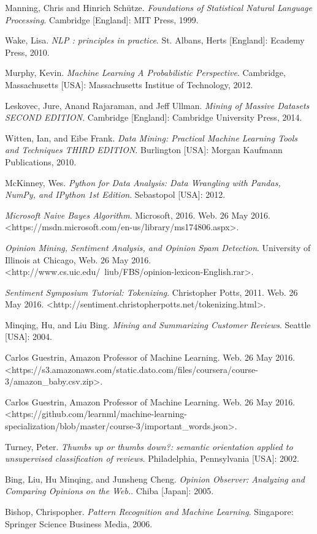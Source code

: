 \documentclass[12pt]{report}
\begin{document}
\begin{thebibliography}{9}

 Manning, Chris and Hinrich Sch{\"u}tze. \textit{Foundations of Statistical Natural Language Processing}. Cambridge [England]: MIT Press, 1999.

 Wake, Lisa. \textit{NLP : principles in practice}. St. Albans, Herts [England]: Ecademy Press, 2010.

 Murphy, Kevin. \textit{Machine Learning A Probabilistic Perspective}. Cambridge, Massachusetts [USA]: Massachusetts Institue of Technology, 2012.

 Leskovec, Jure, Anand Rajaraman, and Jeff Ullman. \textit{Mining of Massive Datasets SECOND EDITION}. Cambridge [England]: Cambridge University Press, 2014.

 Witten, Ian, and Eibe Frank. \textit{Data Mining: Practical Machine Learning Tools and Techniques THIRD EDITION}. Burlington [USA]: Morgan Kaufmann Publications, 2010.

 McKinney, Wes. \textit{Python for Data Analysis: Data Wrangling with Pandas, NumPy, and IPython 1st Edition}. Sebastopol [USA]: 2012.

 \textit{Microsoft Naive Bayes Algorithm}. Microsoft, 2016. Web. 26 May 2016. <https://msdn.microsoft.com/en-us/library/ms174806.aspx>.

 \textit{Opinion Mining, Sentiment Analysis, and Opinion Spam Detection}. University of Illinois at Chicago, Web. 26 May 2016. <http://www.cs.uic.edu/~liub/FBS/opinion-lexicon-English.rar>.

 \textit{Sentiment Symposium Tutorial: Tokenizing}. Christopher Potts, 2011. Web. 26 May 2016. <http://sentiment.christopherpotts.net/tokenizing.html>.

 Minqing, Hu, and Liu Bing. \textit{Mining and Summarizing Customer Reviews}. Seattle [USA]: 2004.

 Carlos Guestrin, Amazon Professor of Machine Learning. Web. 26 May 2016. <https://s3.amazonaws.com/static.dato.com/files/coursera/course-3/amazon\_baby.csv.zip>.

 Carlos Guestrin, Amazon Professor of Machine Learning. Web. 26 May 2016. <https://github.com/learnml/machine-learning-specialization/blob/master/course-3/important\_words.json>.

 Turney, Peter. \textit{Thumbs up or thumbs down?: semantic orientation applied to unsupervised classification of reviews}. Philadelphia, Pennsylvania [USA]: 2002.

 Bing, Liu, Hu Minqing, and Junsheng Cheng. \textit{Opinion Observer: Analyzing and Comparing Opinions on the Web.}. Chiba [Japan]: 2005.

 Bishop, Chrispopher. \textit{Pattern Recognition and Machine Learning}. Singapore: Springer Science Business Media, 2006.

\end{thebibliography}
\end{document}
